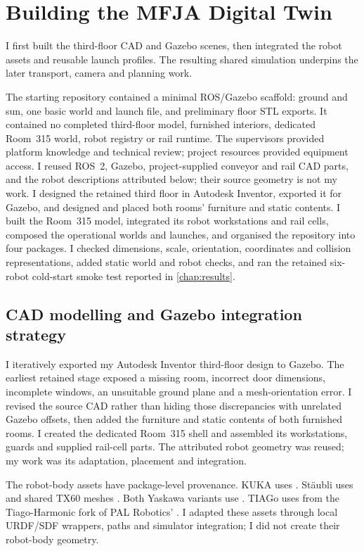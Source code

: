 \chapter{Building the MFJA Digital Twin}
\label{chap:digital-twin}

I first built the third-floor CAD and Gazebo scenes, then integrated the robot
assets and reusable launch profiles. The resulting shared simulation underpins
the later transport, camera and planning work.

\contributionboundary
  {The starting repository contained a minimal ROS/Gazebo scaffold: ground and
  sun, one basic world and launch file, and preliminary floor STL exports. It
  contained no completed third-floor model, furnished interiors, dedicated
  Room~315 world, robot registry or rail runtime.}
  {The supervisors provided platform knowledge and technical review; project
  resources provided equipment access.}
  {I reused ROS~2, Gazebo, project-supplied conveyor and rail CAD parts, and the
  robot descriptions attributed below; their source geometry is not my work.}
  {I designed the retained third floor in Autodesk Inventor, exported it for
  Gazebo, and designed and placed both rooms' furniture and static contents. I
  built the Room~315 model, integrated its robot workstations and rail cells,
  composed the operational worlds and launches, and organised the repository
  into four packages.}
  {I checked dimensions, scale, orientation, coordinates and collision
  representations, added static world and robot checks, and ran the retained
  six-robot cold-start smoke test reported in \cref{chap:results}.}

\section{CAD modelling and Gazebo integration strategy}

I iteratively exported my Autodesk Inventor third-floor design to Gazebo. The
earliest retained stage exposed a missing room, incorrect door dimensions,
incomplete windows, an unsuitable ground plane and a mesh-orientation error. I
revised the source CAD rather than hiding those discrepancies with unrelated
Gazebo offsets, then added the furniture and static contents of both furnished
rooms. I created the dedicated Room~315 shell and assembled its workstations,
guards and supplied rail-cell parts. The attributed robot geometry was reused;
my work was its adaptation, placement and integration.

The robot-body assets have package-level provenance. KUKA uses
 \citep{rosindustrialkuka}. Stäubli uses
 and shared TX60 meshes
\citep{rosindustrialstaubli,rosindustrialstaublitx60}. Both Yaskawa variants
use  \citep{rosindustrialmotoman}. TIAGo uses
 from the Tiago-Harmonic fork of PAL Robotics'
 \citep{tiagoharmonic}. I adapted these assets through local
URDF/SDF wrappers, paths and simulator integration; I did not create their
robot-body geometry.

